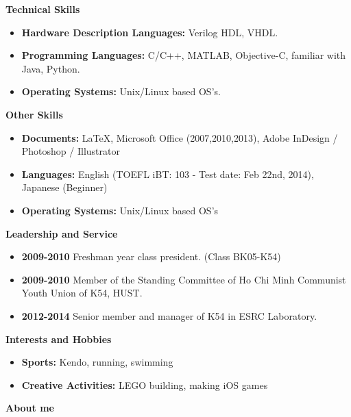 \documentclass[letterpaper,11pt]{article}
\newcommand{\resheading}[1]{{\large \colorbox{mygrey}{\begin{minipage}{\textwidth}{\textbf{#1 \vphantom{p\^{E}}}}\end{minipage}}}}
\begin{document}
\resheading{Technical Skills}
\begin{itemize}
\item
\textbf{Hardware Description Languages:} Verilog HDL, VHDL.
\item
\textbf{Programming Languages:}  C/C++, MATLAB, Objective-C, familiar with Java, Python.
\item
\textbf{Operating Systems:} Unix/Linux based OS's.
\end{itemize}

\resheading{Other Skills}
\begin{itemize}
\item
\textbf{Documents:} \LaTeX, Microsoft Office (2007,2010,2013), Adobe InDesign / Photoshop / Illustrator
\item
\textbf{Languages:} English (TOEFL iBT: 103 - Test date: Feb 22nd, 2014), Japanese (Beginner)
\item
\textbf{Operating Systems:} Unix/Linux based OS's
\end{itemize}

\resheading{Leadership and Service}
\begin{itemize}
\item
\textbf{2009-2010} Freshman year class president. (Class BK05-K54)
\item
\textbf{2009-2010} Member of the Standing Committee of Ho Chi Minh Communist Youth Union of K54, HUST.
\item
\textbf{2012-2014} Senior member and manager of K54 in ESRC Laboratory.
\end{itemize}

\resheading{Interests and Hobbies}
\begin{itemize}
\item
\textbf{Sports:} Kendo, running, swimming
\item
\textbf{Creative Activities:} LEGO building, making iOS games
\end{itemize}

\resheading{About me}
\end{document}
